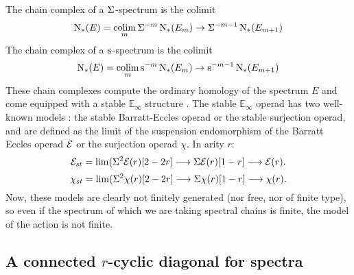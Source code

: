 The chain complex of a $\Sigma^{}$-spectrum is the colimit
\[
 \operatorname{N}_{*}(E) = \operatorname*{colim}_m \Sigma^{-m} \operatorname{N}_{*}(E_m) \to \Sigma^{-m-1} \operatorname{N}_{*}(E_{m+1})
\]
The chain complex of a $\operatorname{s}^{}$-spectrum is the colimit
\[
 \operatorname{N}_{*}(E) = \operatorname*{colim}_m \operatorname{s}^{-m} \operatorname{N}_{*}(E_m) \to \operatorname{s}^{-m-1} \operatorname{N}_{*}(E_{m+1})
\]
These chain complexes compute the ordinary homology of the spectrum $E$ and come equipped with a stable $\mathbb{E}_\infty$ structure \cite{Gill2020}. The stable $\mathbb{E}_\infty$ operad has two well-known models \cite[Appendix]{berger2004combinatorial}: the stable Barratt-Eccles operad or the stable surjection operad, and are defined as the limit of the suspension endomorphism of the Barratt Eccles operad $\mathcal{E}$ or the surjection operad $\chi$. In arity $r$:
\[\mathcal{E}_{st} = \lim( \Sigma^2\mathcal{E}(r)[2-2r] \longrightarrow \Sigma \mathcal{E}(r)[1-r] \longrightarrow \mathcal{E}(r).\]
\[\chi_{st} = \lim( \Sigma^2\chi(r)[2-2r] \longrightarrow \Sigma \chi(r)[1-r] \longrightarrow \chi(r).\]
Now, these models are clearly not finitely generated (nor free, nor of finite type), so even if the spectrum of which we are taking spectral chains is finite, the model of the action is not finite. 


\subsection{A connected $r$-cyclic diagonal for spectra}


